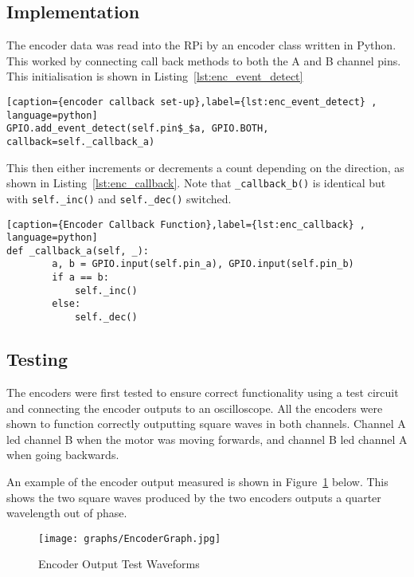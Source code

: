 \subsection{Implementation}\label{elec/encoder/impl}

The encoder data was read into the RPi by an encoder class written in
Python. This worked by connecting call back methods to both the A and B
channel pins. This initialisation is shown in Listing~\ref{lst:enc_event_detect}

\begin{lstlisting}[caption={encoder callback set-up},label={lst:enc_event_detect} , language=python]
GPIO.add_event_detect(self.pin$_$a, GPIO.BOTH, callback=self._callback_a)
\end{lstlisting}

This then either increments or decrements a count depending on the
direction, as shown in Listing~\ref{lst:enc_callback}. Note that
\verb|_callback_b()| is identical but with \verb|self._inc()| and
\verb|self._dec()| switched.

\begin{lstlisting}[caption={Encoder Callback Function},label={lst:enc_callback} , language=python]
def _callback_a(self, _):
        a, b = GPIO.input(self.pin_a), GPIO.input(self.pin_b)
        if a == b:
            self._inc()
        else:
            self._dec()
\end{lstlisting}


\subsection{Testing}\label{elec/encoder/test}
The encoders were first tested to ensure correct functionality using a test circuit and connecting the encoder outputs to an
oscilloscope. All the encoders were shown to function correctly
outputting square waves in both channels. Channel A led channel B
when the motor was moving forwards, and channel B led channel A when going backwards.

An example of the encoder output measured is shown in Figure~\ref{EncoderGraph} below. This shows the two square waves produced by the
two encoders outputs a quarter wavelength out of phase.

\begin{figure}[!ht]
	\centering
	\texttt{[image: graphs/EncoderGraph.jpg]}
	\caption{Encoder Output Test Waveforms}\label{EncoderGraph}

\end{figure}

